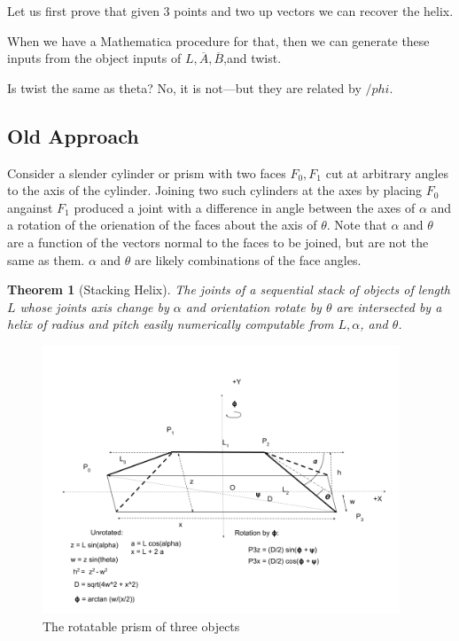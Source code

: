 \documentclass[11pt]{article}
\newtheorem{theorem}{Theorem}
\begin{document}
Let us first prove that given 3 points and two up vectors we can recover the helix.

When we have a Mathematica procedure for that, then we can generate these inputs
from the object inputs of $L,\overline{A},\overline{B}$,and twist.

Is twist the same as theta? No, it is not---but they are related by $/phi$.



\subsection{Old Approach}


Consider a slender cylinder or prism with two faces $F_0,F_1$ cut at arbitrary angles to the axis of the cylinder.
Joining two such cylinders at the axes by placing $F_0$ angainst $F_1$ produced a joint with a difference in
angle between the axes of $\alpha$ and a rotation of the orienation of the faces about the axis of $\theta$.
Note that $\alpha$ and $\theta$ are a function of the vectors normal to the faces to be joined, but are not the same as them. $\alpha$ and $\theta$ are likely combinations of the face angles.

\begin{theorem}[Stacking Helix]
  The joints of a sequential stack of objects of length $L$ whose joints axis change by $\alpha$ and orientation rotate
  by $\theta$ are intersected by a helix of radius and pitch easily numerically computable
  from  $L,\alpha$, and $\theta$.
\end{theorem}

\begin{figure}
     \centering
     \includegraphics[width=0.95\textwidth]{figures/StackedSetup.png}
     \caption{The rotatable prism of three objects}
  \label{fig:prismdiagram}
\end{figure}
\end{document}
